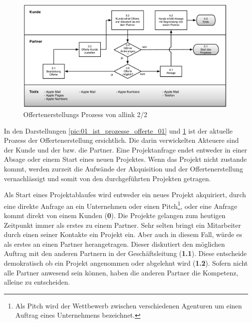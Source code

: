 \begin{figure}[p]
\begin{center}
\includegraphics[width=0.99\textwidth,angle=0]{./bilder/analyse/01_ist_prozesse_offerte_02.pdf}
\caption[Offertenerstellungs Prozess von allink 2/2]{Offertenerstellungs 
    Prozess von allink 2/2\footnotemark}
\label{pic:01_ist_prozesse_offerte_02}
\end{center}
\end{figure}

In den Darstellungen \ref{pic:01_ist_prozesse_offerte_01} und
\ref{pic:01_ist_prozesse_offerte_02} ist der aktuelle Prozess der Offertenerstellung 
ersichtlich. Die darin verwickelten Akteuere sind der Kunde und der bzw. die Partner.
Eine Projektanfrage endet entweder in einer Absage oder einem Start eines neuen 
Projektes. Wenn das Projekt nicht zustande kommt, werden zurzeit die Aufwände der
Akquisition und der Offertenerstellung vernachlässigt und somit von
den durchgeführten Projekten getragen.

Als Start eines Projektablaufes wird entweder ein neues Projekt akquiriert, 
durch eine direkte Anfrage an ein Unternehmen oder einen Pitch\footnote{Als Pitch 
wird der Wettbewerb zwischen verschiedenen Agenturen um einen Auftrag eines 
Unternehmens bezeichnet.}, oder eine Anfrage kommt direkt von einem Kunden (\textbf{0}). 
Die Projekte gelangen zum heutigen Zeitpunkt immer als erstes zu einem Partner. 
Sehr selten bringt ein Mitarbeiter durch einen seiner Kontakte ein Projekt ein. 
Aber auch in diesem Fall, würde es als erstes an einen Partner herangetragen.
Dieser diskutiert den möglichen Auftrag mit den anderen Partnern in der 
Geschäftsleitung (\textbf{1.1}). Diese entscheide demokratisch ob ein Projekt 
angenommen oder abgelehnt wird (\textbf{1.2}). Sofern nicht alle Partner anwesend 
sein können, haben die anderen Partner die Kompetenz, alleine zu entscheiden.

